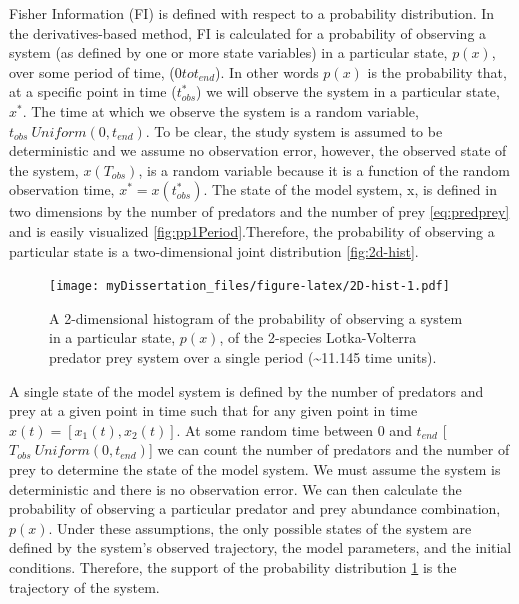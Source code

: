\documentclass[12pt,twoside]{reedthesis}
\begin{document}
Fisher Information (FI) is defined with respect to a probability
distribution. In the derivatives-based method, FI is calculated for a
probability of observing a system (as defined by one or more state
variables) in a particular state, \(p(x)\), over some period of time,
(\(0 to t_{end}\)). In other words \(p(x)\) is the probability that, at
a specific point in time (\(t_{obs}^*\)) we will observe the system in a
particular state, \(x^*\). The time at which we observe the system is a
random variable, \(t_{obs} ~ Uniform(0,t_{end})\). To be clear, the
study system is assumed to be deterministic and we assume no observation
error, however, the observed state of the system, \(x(T_{obs})\), is a
random variable because it is a function of the random observation time,
\(x^*= x(t_{obs}^*)\). The state of the model system, x, is defined in
two dimensions by the number of predators and the number of prey
\eqref{eq:predprey} and is easily visualized
\ref{fig:pp1Period}.Therefore, the probability of observing a particular
state is a two-dimensional joint distribution \ref{fig:2d-hist}.
\begin{figure}
\centering
\texttt{[image: myDissertation\_files/figure-latex/2D-hist-1.pdf]}
\caption{\label{fig:2D-hist}A 2-dimensional histogram of the probability of
observing a system in a particular state, \(p(x)\), of the 2-species
Lotka-Volterra predator prey system over a single period
(\textasciitilde{}11.145 time units).}
\end{figure}
A single state of the model system is defined by the number of predators
and prey at a given point in time such that for any given point in time
\(x(t)=[x_1 (t),x_2 (t)]\). At some random time between 0 and
\(t_{end}\) {[}\(T_{obs} ~ Uniform(0,t_{end})\){]} we can count the
number of predators and the number of prey to determine the state of the
model system. We must assume the system is deterministic and there is no
observation error. We can then calculate the probability of observing a
particular predator and prey abundance combination, \(p(x)\). Under
these assumptions, the only possible states of the system are defined by
the system's observed trajectory, the model parameters, and the initial
conditions. Therefore, the support of the probability distribution
\ref{fig:2D-hist} is the trajectory of the system.
\end{document}
